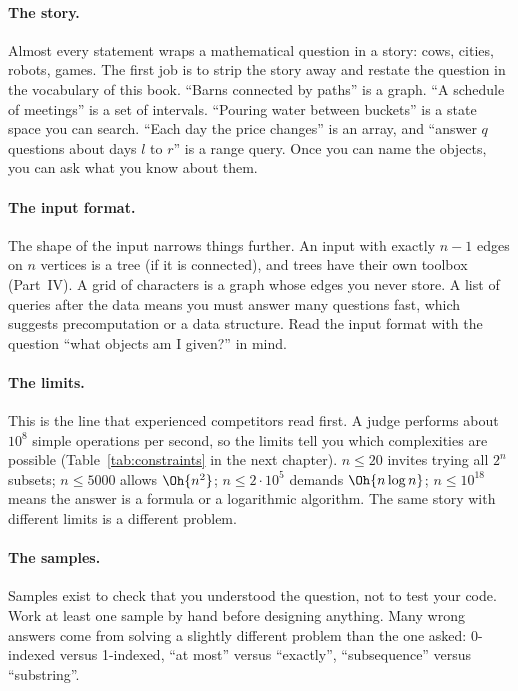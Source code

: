 \paragraph{The story.} Almost every statement wraps a mathematical question in a story: cows, cities, robots, games. The
first job is to strip the story away and restate the question in the vocabulary of this book. ``Barns connected by paths''
is a graph. ``A schedule of meetings'' is a set of intervals. ``Pouring water between buckets'' is a state space you can
search. ``Each day the price changes'' is an array, and ``answer $q$ questions about days $l$ to $r$'' is a range query.
Once you can name the objects, you can ask what you know about them.

\paragraph{The input format.} The shape of the input narrows things further. An input with exactly $n - 1$ edges on $n$
vertices is a tree (if it is connected), and trees have their own toolbox (Part~IV). A grid of characters is a graph whose
edges you never store. A list of queries after the data means you must answer many questions fast, which suggests
precomputation or a data structure. Read the input format with the question ``what objects am I given?'' in mind.

\paragraph{The limits.} This is the line that experienced competitors read first. A judge performs about $10^8$ simple
operations per second, so the limits tell you which complexities are possible (Table~\ref{tab:constraints} in the next
chapter). $n \le 20$ invites trying all $2^n$ subsets; $n \le 5000$ allows $\Oh{n^2}$; $n \le 2 \cdot 10^5$ demands
$\Oh{n \log n}$; $n \le 10^{18}$ means the answer is a formula or a logarithmic algorithm. The same story with different
limits is a different problem.

\paragraph{The samples.} Samples exist to check that you understood the question, not to test your code. Work at least one
sample by hand before designing anything. Many wrong answers come from solving a slightly different problem than the one
asked: 0-indexed versus 1-indexed, ``at most'' versus ``exactly'', ``subsequence'' versus ``substring''.

